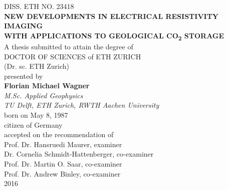 \begin{titlepage}
	\begin{center}
		{\large
			DISS. ETH NO. 23418\\
		}
		\vspace{1cm}
		{\LARGE
			\Large\bfseries{NEW DEVELOPMENTS IN ELECTRICAL RESISTIVITY IMAGING\\WITH APPLICATIONS TO GEOLOGICAL CO\textsubscript{2} STORAGE} \\[0.5cm]
		}
		\vfill
		{\large
			A thesis submitted to attain the degree of\\
			\vspace{0.1cm}
			DOCTOR OF SCIENCES of ETH ZURICH\\
			\vspace{0.1cm}
			(Dr. sc. ETH Zurich)\\
			\vspace{0.4cm}
			\vfill
			presented by\\
			\vspace{0.5cm}
			\textbf{Florian Michael Wagner}\\
			\vspace{0.5cm}
			{\itshape
				M.Sc. Applied Geophysics\\
				TU Delft, ETH Zurich, RWTH Aachen University\\}
			\vspace{0.25cm}
			born on May 8, 1987\\
			citizen of Germany\\
			\vfill
			accepted on the recommendation of\\[0.5cm] %


			Prof. Dr. Hansruedi Maurer, examiner\\
			Dr. Cornelia Schmidt-Hattenberger, co-examiner\\
			Prof. Dr. Martin O. Saar, co-examiner\\
			Prof. Dr. Andrew Binley, co-examiner\\
		}
		\vfill
		{\large
			2016\\}
		\vfill
	\end{center}

\end{titlepage}
